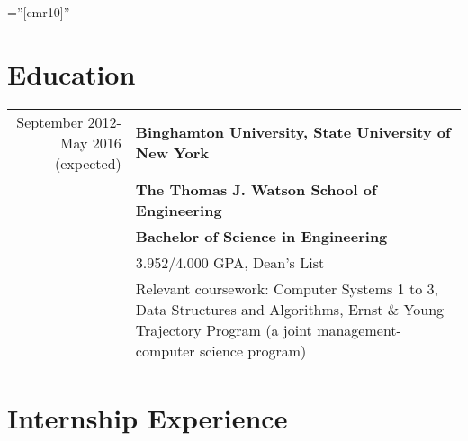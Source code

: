\documentclass[letterpaper,10pt]{article} %
\begin{document}
\pagestyle{empty} %

\font\fb=''[cmr10]'' %

\par{\par} %
\par{\par}
\par{\par}
\par{\par}

\section{Education}

\begin{longtable}{r|p{4.25in}}	
    September 2012-May 2016 (expected) & \textbf{Binghamton University, State University of New York} \\
    & \textbf{The Thomas J. Watson School of Engineering} \\
    & \textbf{Bachelor of Science in Engineering} \\
    & 3.952/4.000 GPA, Dean's List \\
    & Relevant coursework: Computer Systems 1 to 3, Data Structures and Algorithms,
    Ernst \& Young Trajectory Program \footnotesize{(a joint management-computer science program)} \\
\end{longtable}

\section{Internship Experience}
\end{document}
